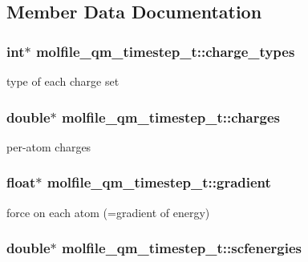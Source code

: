 \subsection{\-Member \-Data \-Documentation}
\hypertarget{structmolfile__qm__timestep__t_aac492bc636fb040648cb013b5fa2fb3f}{
\subsubsection[{charge\-\_\-types}]{\setlength{\rightskip}{0pt plus 5cm}int$\ast$ {\bf molfile\-\_\-qm\-\_\-timestep\-\_\-t\-::charge\-\_\-types}}}\label{structmolfile__qm__timestep__t_aac492bc636fb040648cb013b5fa2fb3f}
type of each charge set \hypertarget{structmolfile__qm__timestep__t_a79650cf04b5ae7657547d18a1e01e179}{
\subsubsection[{charges}]{\setlength{\rightskip}{0pt plus 5cm}double$\ast$ {\bf molfile\-\_\-qm\-\_\-timestep\-\_\-t\-::charges}}}\label{structmolfile__qm__timestep__t_a79650cf04b5ae7657547d18a1e01e179}
per-\/atom charges \hypertarget{structmolfile__qm__timestep__t_a837a7b0303ef98e8f09537297b1fc19a}{
\subsubsection[{gradient}]{\setlength{\rightskip}{0pt plus 5cm}float$\ast$ {\bf molfile\-\_\-qm\-\_\-timestep\-\_\-t\-::gradient}}}\label{structmolfile__qm__timestep__t_a837a7b0303ef98e8f09537297b1fc19a}
force on each atom (=gradient of energy) \hypertarget{structmolfile__qm__timestep__t_ad0d8c7fca3efe89733c9f31ad867d3f3}{
\subsubsection[{scfenergies}]{\setlength{\rightskip}{0pt plus 5cm}double$\ast$ {\bf molfile\-\_\-qm\-\_\-timestep\-\_\-t\-::scfenergies}}}\label{structmolfile__qm__timestep__t_ad0d8c7fca3efe89733c9f31ad867d3f3}
